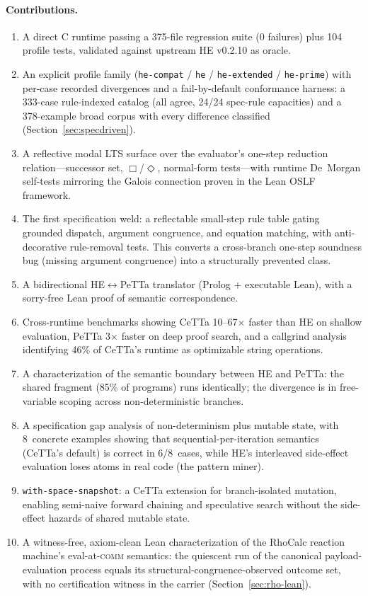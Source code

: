 \documentclass[11pt]{article}
\newcommand{\code}[1]{\texttt{#1}}
\newcommand{\PeTTa}{\textup{PeTTa}}
\newcommand{\HE}{\textup{HE}}
\newcommand{\CeTTa}{\textup{CeTTa}}
\newcommand{\RhoCalc}{\textup{RhoCalc}}
\begin{document}
\paragraph{Contributions.}
\begin{enumerate}
\item A direct C runtime passing a 375-file regression suite (0
  failures) plus 104 profile tests, validated against upstream \HE{}
  v0.2.10 as oracle.
\item An explicit profile family (\code{he-compat} / \code{he} /
  \code{he-extended} / \code{he-prime}) with per-case recorded
  divergences and a fail-by-default conformance harness: a 333-case
  rule-indexed catalog (all agree, 24/24 spec-rule capacities) and a
  378-example broad corpus with every difference classified
  (Section~\ref{sec:specdriven}).
\item A reflective modal LTS surface over the evaluator's one-step
  reduction relation---successor set, $\Box$/$\Diamond$,
  normal-form tests---with runtime De~Morgan self-tests mirroring the
  Galois connection proven in the Lean OSLF framework.
\item The first specification weld: a reflectable small-step rule
  table gating grounded dispatch, argument congruence, and equation
  matching, with anti-decorative rule-removal tests.  This converts a
  cross-branch one-step soundness bug (missing argument congruence)
  into a structurally prevented class.
\item A bidirectional \HE{}$\leftrightarrow$\PeTTa{} translator
  (Prolog + executable Lean), with a sorry-free Lean proof of semantic
  correspondence.
\item Cross-runtime benchmarks showing \CeTTa{} 10--67$\times$ faster
  than \HE{} on shallow evaluation, \PeTTa{} 3$\times$ faster on deep
  proof search, and a callgrind analysis identifying 46\% of \CeTTa{}'s
  runtime as optimizable string operations.
\item A characterization of the semantic boundary between \HE{} and
  \PeTTa{}: the shared fragment (85\% of programs) runs identically; the
  divergence is in free-variable scoping across non-deterministic branches.
\item A specification gap analysis of non-determinism plus mutable state,
  with 8~concrete examples showing that sequential-per-iteration semantics
  (CeTTa's default) is correct in 6/8~cases, while \HE{}'s interleaved
  side-effect evaluation loses atoms in real code (the pattern miner).
\item \code{with-space-snapshot}: a CeTTa extension for branch-isolated
  mutation, enabling semi-naive forward chaining and speculative search
  without the side-effect hazards of shared mutable state.
\item A witness-free, axiom-clean Lean characterization of the \RhoCalc{}
  reaction machine's eval-at-\textsc{comm} semantics: the quiescent run of the
  canonical payload-evaluation process equals its
  structural-congruence-observed outcome set, with no certification witness in
  the carrier (Section~\ref{sec:rho-lean}).
\end{enumerate}
\end{document}
